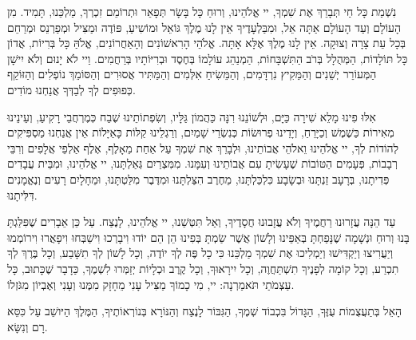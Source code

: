 נִשְׁמַת כָּל חַי תְּבָרֵךְ אֶת שִׁמְךָ, יי אֱלֹהֵינוּ, וְרוּחַ כָּל בָּשָׂר תְּפָאֵר וּתְרוֹמֵם זִכְרְךָ, מַלְכֵּנוּ, תָּמִיד. מִן הָעוֹלָם וְעַד הָעוֹלָם אַתָּה אֵל, וּמִבַּלְעָדֶיךָ אֵין לָנוּ מֶלֶךְ גּוֹאֵל וּמוֹשִיעַ, פּוֹדֶה וּמַצִּיל וּמְפַרְנֵס וּמְרַחֵם בְּכָל עֵת צָרָה וְצוּקָה. אֵין לָנוּ מֶלֶךְ אֶלָּא אָתָּה. אֱלֹהֵי הָרִאשׁוֹנִים וְהָאַחֲרוֹנִים, אֱלֹהַּ כָּל בְּרִיוֹת, אֲדוֹן כָּל תּוֹלָדוֹת, הַמְּהֻלָל בְּרֹב הַתִּשְׁבָּחוֹת, הַמְנַהֵג עוֹלָמוֹ בְּחֶסֶד וּבְרִיּוֹתָיו בְּרַחֲמִים. וַיי לֹא יָנוּם וְלֹא יִישָׁן הַמְּעוֹרֵר יְשֵׁנִים וְהַמֵּקִיץ נִרְדָּמִים, וְהַמֵּשִׂיחַ אִלְּמִים וְהַמַּתִּיר אֲסוּרִים וְהַסּוֹמֵךְ נוֹפְלִים וְהַזּוֹקֵף כְּפוּפִים לְךָ לְבַדְּךָ אֲנַחְנוּ מוֹדִים.

\vspace{0.5em}

אִלּוּ פִינוּ מָלֵא שִׁירָה כַּיָּם, וּלְשׁוֹנֵנוּ רִנָּה כַּהֲמוֹן גַּלָּיו, וְשִׂפְתוֹתֵינוּ שֶׁבַח כְּמֶרְחֲבֵי רָקִיעַ, וְעֵינֵינוּ מְאִירוֹת כַּשֶׁמֶשׁ וְכַיָּרֵחַ, וְיָדֵינוּ פְרוּשׂוֹת כְּנִשְׂרֵי שָׁמַיִם, וְרַגְלֵינוּ קַלּוֹת כָּאַיָּלוֹת אֵין אֲנַחְנוּ מַסְפִּיקִים לְהוֹדוֹת לְךָ, יי אֱלֹהֵינוּ וֵאלֹהֵי אֲבוֹתֵינוּ, וּלְבָרֵךְ אֶת שִׁמְךָ עַל אַחַת מֵאָלֶף, אֶלֶף אַלְפֵי אֲלָפִים וְרִבֵּי רְבָבוֹת, פְּעָמִים הַטּוֹבוֹת שֶׁעָשִׂיתָ עִם אֲבוֹתֵינוּ וְעִמָּנוּ. מִמִּצְרַיִם גְּאַלְתָּנוּ, יי אֱלֹהֵינוּ, וּמִבֵּית עֲבָדִים פְּדִיתָנוּ, בְּרָעָב זַנְתָּנוּ וּבְשָׂבָע כִּלְכַּלְתָּנוּ, מֵחֶרֶב הִצַּלְתָּנוּ וּמִדֶּבֶר מִלַּטְתָּנוּ, וּמֵחָלָיִם רָעִים וְנֶאֱמָנִים דִּלִּיתָנוּ.

\vspace{0.5em}

עַד הֵנָּה עֲזָרוּנוּ רַחֲמֶיךָ וְלֹא עֲזָבוּנוּ חֲסָדֶיךָ, וְאַל תִּטְּשֵׁנוּ, יי אֱלֹהֵינוּ, לָנֶצַח. עַל כֵּן אֵבָרִים שֶׁפִּלַּגְתָּ בָּנוּ וְרוּחַ וּנְשָׁמָה שֶׁנָּפַחְתָּ בְּאַפֵּינוּ וְלָשׁוֹן אֲשֶׁר שַׂמְתָּ בְּפִינוּ הֵן הֵם יוֹדוּ וִיבָרְכוּ וִישַׁבְּחוּ וִיפָאֲרוּ וִירוֹמְמוּ וְיַעֲרִיצוּ וְיַקְדִּישׁוּ וְיַמְלִיכוּ אֶת שִׁמְךָ מַלְכֵּנוּ כִּי כָל פֶּה לְךָ יוֹדֶה, וְכָל לָשׁוֹן לְךָ תִשָּׁבַע, וְכָל בֶּרֶךְ לְךָ תִכְרַע, וְכָל קוֹמָה לְפָנֶיךָ תִשְׁתַּחֲוֶה, וְכָל יִירָאוּךָ, וְכָל קֶרֶב וּכְלָיוֹת יְזַמְּרוּ לִשְׁמֶךָ, כַּדָבָר שֶׁכָּתוּב, כָּל עַצְמֹתַי תֹּאמַרְנָה: יי, מִי כָמוֹךָ מַצִּיל עָנִי מֵחָזָק מִמֶּנוּ וְעָנִי וְאֶבְיוֹן מִגֹּזְלוֹ.

\vspace{0.5em}

הָאֵל בְּתַעֲצֻמוֹת עֻזֶּךָ, הַגָּדוֹל בִּכְבוֹד שְׁמֶךָ, הַגִּבּוֹר לָנֶצַח וְהַנּוֹרָא בְּנוֹרְאוֹתֶיךָ, הַמֶּלֶךְ הַיּושֵׁב עַל כִּסֵּא רָם וְנִשָּׂא.


